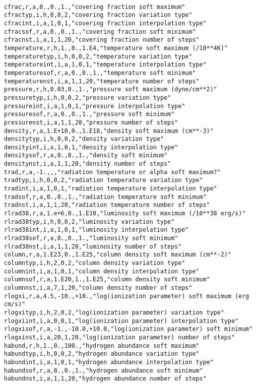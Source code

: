 \begin{verbatim}

cfrac,r,a,0.,0.,1.,"covering fraction soft maximum"
cfractyp,i,h,0,0,2,"covering fraction variation type"
cfracint,i,a,1,0,1,"covering fraction interpolation type"
cfracsof,r,a,0.,0.,1.,"covering fraction soft minimum"
cfracnst,i,a,1,1,20,"covering fraction number of steps"
temperature,r,h,1.,0.,1.E4,"temperature soft maximum (/10**4K)"
temperaturetyp,i,h,0,0,2,"temperature variation type"
temperatureint,i,a,1,0,1,"temperature interpolation type"
temperaturesof,r,a,0.,0.,1.,"temperature soft minimum"
temperaturenst,i,a,1,1,20,"temperature number of steps"
pressure,r,h,0.03,0.,1.,"pressure soft maximum (dyne/cm**2)"
pressuretyp,i,h,0,0,2,"pressure variation type"
pressureint,i,a,1,0,1,"pressure interpolation type"
pressuresof,r,a,0.,0.,1.,"pressure soft minimum"
pressurenst,i,a,1,1,20,"pressure number of steps"
density,r,a,1.E+10,0.,1.E18,"density soft maximum (cm**-3)"
densitytyp,i,h,0,0,2,"density variation type"
densityint,i,a,1,0,1,"density interpolation type"
densitysof,r,a,0.,0.,1.,"density soft minimum"
densitynst,i,a,1,1,20,"density number of steps"
trad,r,a,-1.,,,"radiation temperature or alpha soft maximum?"
tradtyp,i,h,0,0,2,"radiation temperature variation type"
tradint,i,a,1,0,1,"radiation temperature interpolation type"
tradsof,r,a,0.,0.,1.,"radiation temperature soft minimum"
tradnst,i,a,1,1,20,"radiation temperature number of steps"
rlrad38,r,a,1.e+6,0.,1.E10,"luminosity soft maximum (/10**38 erg/s)"
rlrad38typ,i,h,0,0,2,"luminosity variation type"
rlrad38int,i,a,1,0,1,"luminosity interpolation type"
rlrad38sof,r,a,0.,0.,1.,"luminosity soft minimum"
rlrad38nst,i,a,1,1,20,"luminosity number of steps"
column,r,a,1.E23,0.,1.E25,"column density soft maximum (cm**-2)"
columntyp,i,h,2,0,2,"column density variation type"
columnint,i,a,1,0,1,"column density interpolation type"
columnsof,r,a,1.E20,1.,1.E25,"column density soft minimum"
columnnst,i,a,7,1,20,"column density number of steps"
rlogxi,r,a,4.5,-10.,+10.,"log(ionization parameter) soft maximum (erg cm/s)"
rlogxityp,i,h,2,0,2,"log(ionization parameter) variation type"
rlogxiint,i,a,0,0,1,"log(ionization parameter) interpolation type"
rlogxisof,r,a,-1.,-10.0,+10.0,"log(ionization parameter) soft minimum"
rlogxinst,i,a,20,1,20,"log(ionization parameter) number of steps"
habund,r,h,1.,0.,100.,"hydrogen abundance soft maximum"
habundtyp,i,h,0,0,2,"hydrogen abundance variation type"
habundint,i,a,1,0,1,"hydrogen abundance interpolation type"
habundsof,r,a,0.,0.,1.,"hydrogen abundance soft minimum"
habundnst,i,a,1,1,20,"hydrogen abundance number of steps"

\end{verbatim}
